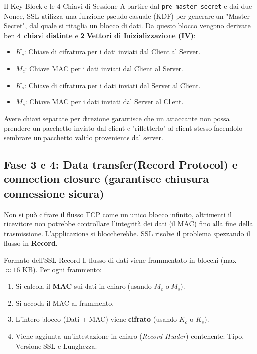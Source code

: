 \documentclass[a4paper,12pt]{report}
\begin{document}
\begin{defbox}{Il Key Block e le 4 Chiavi di Sessione}
A partire dal \texttt{pre\_master\_secret} e dai due Nonce, SSL utilizza una funzione pseudo-casuale (KDF) per generare un "Master Secret", dal quale si ritaglia un blocco di dati. Da questo blocco vengono derivate ben \textbf{4 chiavi distinte} e \textbf{2 Vettori di Inizializzazione (IV)}:
\begin{itemize}
    \item $K_c$: Chiave di cifratura per i dati inviati dal Client al Server.
    \item $M_c$: Chiave MAC per i dati inviati dal Client al Server.
    \item $K_s$: Chiave di cifratura per i dati inviati dal Server al Client.
    \item $M_s$: Chiave MAC per i dati inviati dal Server al Client.
\end{itemize}
Avere chiavi separate per direzione garantisce che un attaccante non possa prendere un pacchetto inviato dal client e "rifletterlo" al client stesso facendolo sembrare un pacchetto valido proveniente dal server.
\end{defbox}

\subsection{Fase 3 e 4: Data transfer(Record Protocol) e connection closure (garantisce chiusura connessione sicura)}
Non si può cifrare il flusso TCP come un unico blocco infinito, altrimenti il ricevitore non potrebbe controllare l'integrità dei dati (il MAC) fino alla fine della trasmissione. L'applicazione si bloccherebbe. SSL risolve il problema spezzando il flusso in \textbf{Record}.

\begin{notebox}{Formato dell'SSL Record}
Il flusso di dati viene frammentato in blocchi (max $\approx 16$ KB). Per ogni frammento:
\begin{enumerate}
    \item Si calcola il \textbf{MAC} sui dati in chiaro (usando $M_c$ o $M_s$).
    \item Si accoda il MAC al frammento.
    \item L'intero blocco (Dati + MAC) viene \textbf{cifrato} (usando $K_c$ o $K_s$).
    \item Viene aggiunta un'intestazione in chiaro (\textit{Record Header}) contenente: Tipo, Versione SSL e Lunghezza.
\end{enumerate}
\end{notebox}
\end{document}
